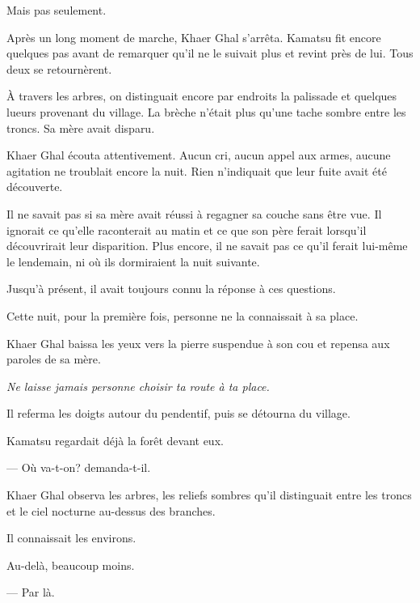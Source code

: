 Mais pas seulement.

Après un long moment de marche, Khaer Ghal s'arrêta. Kamatsu fit encore
quelques pas avant de remarquer qu'il ne le suivait plus et revint près de lui.
Tous deux se retournèrent.

À travers les arbres, on distinguait encore par endroits la palissade et
quelques lueurs provenant du village. La brèche n'était plus qu'une tache
sombre entre les troncs. Sa mère avait disparu.

Khaer Ghal écouta attentivement. Aucun cri, aucun appel aux armes, aucune
agitation ne troublait encore la nuit. Rien n'indiquait que leur fuite avait
été découverte.

Il ne savait pas si sa mère avait réussi à regagner sa couche sans être vue. Il
ignorait ce qu'elle raconterait au matin et ce que son père ferait lorsqu'il
découvrirait leur disparition. Plus encore, il ne savait pas ce qu'il ferait
lui-même le lendemain, ni où ils dormiraient la nuit suivante.

Jusqu'à présent, il avait toujours connu la réponse à ces questions.

Cette nuit, pour la première fois, personne ne la connaissait à sa place.

Khaer Ghal baissa les yeux vers la pierre suspendue à son cou et repensa aux
paroles de sa mère.

\emph{Ne laisse jamais personne choisir ta route à ta place.}

Il referma les doigts autour du pendentif, puis se détourna du village.

Kamatsu regardait déjà la forêt devant eux.

— Où va-t-on? demanda-t-il.

Khaer Ghal observa les arbres, les reliefs sombres qu'il distinguait entre les
troncs et le ciel nocturne au-dessus des branches.

Il connaissait les environs.

Au-delà, beaucoup moins.

— Par là.
